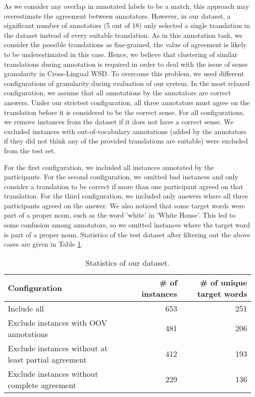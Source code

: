 {As we consider any overlap in annotated labels to be a match, this approach may overestimate the agreement between annotators. However, in our dataset, a significant number of annotators (5 out of 18) only selected a single translation in the dataset instead of every suitable translation. As in this annotation task, we consider the possible translations as  fine-grained, the value of agreement is likely to be underestimated in this case. Hence, we believe that clustering of similar translations during annotation is required in order to deal with the issue of sense granularity in Cross-Lingual WSD. To overcome this problem, we used different configurations of granularity during evaluation of our system. In the most relaxed configuration, we assume that all annotations by the annotators are correct answers. Under our strictest configuration, all three annotators must agree on the translation before it is considered to be the correct sense. For all configurations, we remove instances from the dataset if it does not have a correct sense. We excluded instances with out-of-vocabulary annotations (added by the annotators if they did not think any of the provided translations are suitable) were excluded from the test set.

For the first configuration, we included all instances annotated by the participants. For the second configuration, we omitted bad instances and only consider a translation to be correct if more than one participant agreed on that translation. For the third configuration, we included only answers where all three participants agreed on the answer. We also noticed that some target words were part of a proper noun, such as the word 'white' in 'White House'. This led to some confusion among annotators, so we omitted instances where the target word is part of a proper noun. Statistics of the test dataset after filtering out the above cases are given in Table \ref{table:CLWSD-test-stats-no-ne}.

\begin{table}[ht]
	\caption{Statistics of our dataset.}
	\label{table:CLWSD-test-stats-no-ne}
	\begin{center}
		\begin{tabular}{| p{8cm} | r| r|}
			\hline
			Configuration & \# of instances & \# of unique target words \\
			\hline
			Include all & 653 & 251\\ 
			\hline
			Exclude instances with OOV annotations & 481 & 206 \\						
			\hline
			Exclude instances without at least partial agreement & 412 & 193 \\
			\hline
			Exclude instances without complete agreement & 229 & 136 \\
			\hline
		\end{tabular}
	\end{center}
\end{table}

}
